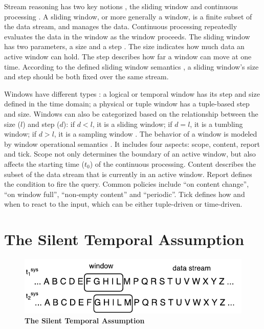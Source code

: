 Stream reasoning has two key notions \cite{barbieri2010stream}, the sliding window \cite{arasu2003stream} and continuous processing \cite{babu2001continuous}.
A sliding window, or more generally a window, is a finite subset of the data stream, and manages the data.
Continuous processing repeatedly evaluates the data in the window as the window proceeds. 
The sliding window has two parameters, a size and a step \cite{stuckenschmidt2010towards}.
The size indicates how much data an active window can hold.
The step describes how far a window can move at one time.
According to the defined sliding window semantics \cite{botan2010secret}, a sliding window's size and step should be both fixed over the same stream. 

Windows have different types \cite{barbieri2010querying}:
a logical or temporal window has its step and size defined in the time domain; 
a physical or tuple window has a tuple-based step and size.
Windows can also be categorized based on the relationship between the size ($l$) and step ($d$):
if $d < l$, it is a sliding window;
if $d = l$, it is a tumbling window;
if $d > l$, it is a sampling window \cite{calbimonte2010enabling}. 
The behavior of a window is modeled by window operational semantics \cite{botan2010secret} \cite{dell2013correctness}. 
It includes four aspects: scope, content, report and tick. 
Scope not only determines the boundary of an active window, but also affects the starting time ($t_{0}$) of the continuous processing.
Content describes the subset of the data stream that is currently in an active window.
Report defines the condition to fire the query.
Common policies include ``on content change'', ``on window full'', ``non-empty content'' and ``periodic''.
Tick defines how and when to react to the input, which can be either tuple-driven or time-driven.  
%
\section{The Silent Temporal Assumption}

\begin{figure}[!htbp]
	\centering
    \includegraphics[width=5in]{img/1-sta.pdf}
    \caption{\textbf{The Silent Temporal Assumption}}
    \label{fig:1-sta}
\end{figure}

